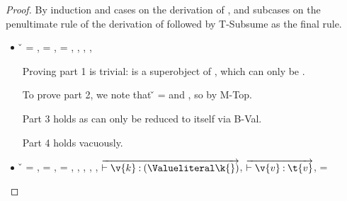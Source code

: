 \begin{lemma} \label{appendix:lemma:soundness}
{\soundnesslemmahypothesis}
\begin{proof}
By induction and cases on the derivation of \opsem {\openv{}} {\e{}} {\a{}},
and subcases on the penultimate rule of the derivation of
\judgementrewrite{\propenv{}}{\ep{}}{\t{}}{\filterset{\thenprop{\prop{}}}{\elseprop{\prop{}}}}{\object{}}{\e{}}
followed by T-Subsume as the final rule.


\begin{case}[B-Val]

  \begin{itemize}
    \item[] 
      \begin{subcase}[T-True]
        \v{} = \true{},
  \ep{} = \true{},
  \e{} = \true{}, \issubtypein{}{\True}{\t{}}, \inpropenv{\topprop{}}{\thenprop{\prop{}}}, 
  \inpropenv{\botprop{}}{\elseprop{\prop{}}}, \issubtypein{}{\emptyobject{}}{\object{}}

        Proving part 1 is trivial: \object{} is a superobject of \emptyobject{}, which can only be \emptyobject{}.

        To prove part 2, we note that \v{} = \true{}
        and \inpropenv{\topprop{}}{\thenprop{\prop{}}},
        so \satisfies{\openv{}}{\thenprop{\prop{}}} by M-Top.

        Part 3 holds as \e{} can only be reduced to itself via B-Val.

        Part 4 holds vacuously.
      \end{subcase}
    \item[]
      \begin{subcase}[T-HMap] \v{} = {},
  \ep{} = {},
  \e{} = {},
  \issubtypein{}{\HMapc {\mandatory{}}}{\t{}},
  \inpropenv{\topprop{}}{\thenprop{\prop{}}},
  \inpropenv{\botprop{}}{\elseprop{\prop{}}},
  \issubtypein{}{\emptyobject{}}{\object{}},
  $\overrightarrow{\judgementtwo {} {\v{k}}{\Value \k{}}}$,
  $\overrightarrow{\judgementtwo {} {\v{v}}{\t{v}}}$,
  \mandatory{} = 


\end{subcase}
\end{itemize}
\end{case}
\end{proof}
\end{lemma}

